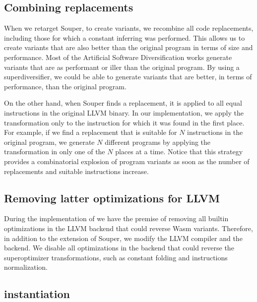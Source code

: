 \subsection*{Combining replacements}

When we retarget Souper, to create variants, we recombine all code replacements, including those for which a constant inferring was performed.
This allows us to create variants that are also better than the original program in terms of size and performance. Most of the Artificial Software Diversification works generate variants that are as performant or iller than the original program. By using a superdiversifier, we could be able to generate variants that are better, in terms of performance, than the original program.

On the other hand, when Souper finds a replacement, it is applied to all equal instructions in the original LLVM binary. In our implementation, we apply the transformation only to the instruction for which it was found in the first place. For example, if we find a replacement that is suitable for $N$ instructions in the original program, we generate $N$ different programs by applying the transformation in only one of the $N$ places at a time. Notice that this strategy provides a combinatorial explosion of program variants as soon as the number of replacements and suitable instructions increase.

\subsection*{Removing latter optimizations for LLVM}

During the implementation of we have the premise of removing all builtin optimizations in the LLVM backend that could reverse Wasm variants.
Therefore, in addition to the extension of Souper, we modify the LLVM compiler and the \wasm backend.
We disable all optimizations in the \wasm backend that could reverse the superoptimizer transformations, such as constant folding and instructions normalization.



\subsection{instantiation}

